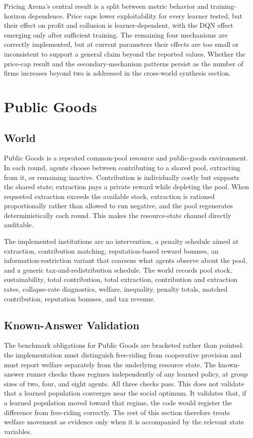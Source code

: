 \documentclass[11pt]{article}
\begin{document}
Pricing Arena's central result is a split between metric behavior and
training-horizon dependence. Price caps lower exploitability for every learner
tested, but their effect on profit and collusion is learner-dependent, with the
DQN effect emerging only after sufficient training. The remaining four
mechanisms are correctly implemented, but at current parameters their effects
are too small or inconsistent to support a general claim beyond the reported
values. Whether the price-cap result and the secondary-mechanism patterns
persist as the number of firms increases beyond two is addressed in the
cross-world synthesis section.


\section{Public Goods}

\subsection{World}

Public Goods is a repeated common-pool resource and public-goods environment. In
each round, agents choose between contributing to a shared pool, extracting from
it, or remaining inactive. Contribution is individually costly but supports the
shared state; extraction pays a private reward while depleting the pool. When
requested extraction exceeds the available stock, extraction is rationed
proportionally rather than allowed to run negative, and the pool regenerates
deterministically each round. This makes the resource-state channel directly
auditable.

The implemented institutions are no intervention, a penalty schedule aimed at
extraction, contribution matching, reputation-based reward bonuses, an
information-restriction variant that coarsens what agents observe about the
pool, and a generic tax-and-redistribution schedule. The world records pool
stock, sustainability, total contribution, total extraction, contribution and
extraction rates, collapse-rate diagnostics, welfare, inequality, penalty
totals, matched contribution, reputation bonuses, and tax revenue.

\subsection{Known-Answer Validation}

The benchmark obligations for Public Goods are bracketed rather than pointed:
the implementation must distinguish free-riding from cooperative provision and
must report welfare separately from the underlying resource state. The
known-answer runner checks those regimes independently of any learned policy, at
group sizes of two, four, and eight agents. All three checks pass. This does not
validate that a learned population converges near the social optimum. It
validates that, if a learned population moved toward that regime, the code would
register the difference from free-riding correctly. The rest of this section
therefore treats welfare movement as evidence only when it is accompanied by the
relevant state variables.
\end{document}
